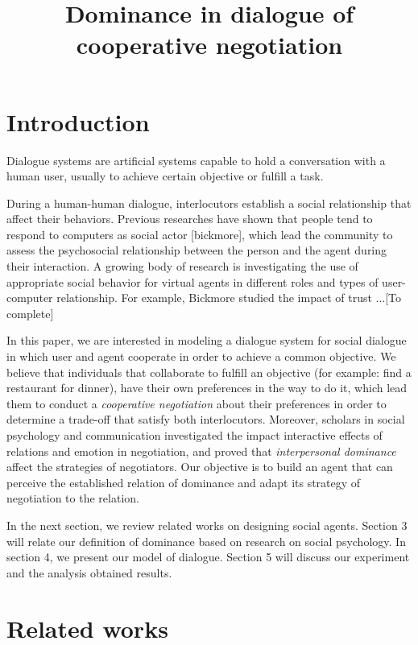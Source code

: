\documentclass{llncs}
\begin{document}
						\title{\vskip -10pt Dominance in dialogue of cooperative negotiation}
						\maketitle
					\section{Introduction}
					Dialogue systems are artificial systems capable to hold a conversation with a human user, usually to achieve certain objective or fulfill a task.
					
					During a human-human dialogue, interlocutors establish a social relationship that affect their behaviors. Previous researches have shown that people tend to respond to computers as social actor [bickmore], which lead the community to assess the psychosocial relationship between the person and the agent during their interaction. 
					A growing body of research is investigating the use of appropriate social behavior for virtual agents in different roles and types of user-computer relationship.
					For example, Bickmore studied the impact of trust ...[To complete]
					
					
					In this paper, we are interested in modeling a dialogue system for social dialogue in which user and agent cooperate in order to achieve a common objective.  We believe that individuals that collaborate to fulfill an objective (for example: find a restaurant for dinner), have their own preferences in the way to do it, which lead them to conduct a \emph{cooperative negotiation} about their preferences in order to determine a trade-off that satisfy both interlocutors. Moreover, scholars in social psychology and communication investigated the impact interactive effects of relations and emotion in negotiation, and proved that  \emph{interpersonal dominance} affect the strategies of negotiators. Our objective is to build an agent that can perceive the established relation of dominance and adapt its strategy of negotiation to the relation. 
					
					In the next section, we review related works on designing social agents. Section 3 will relate our definition of dominance based on research on social psychology. In section 4, we present our model of dialogue. Section 5 will discuss our experiment and the analysis obtained results. 
					
					\section{Related works}
					
\end{document}
